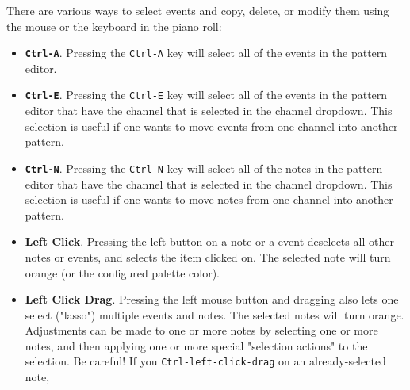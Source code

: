    \setcounter{ItemCounter}{0}      %

   There are various ways to select events and copy, delete, or modify them
   using the mouse or the keyboard in the piano roll:

   \begin{itemize}
      \item
         \textbf{\texttt{Ctrl-A}}.
         Pressing the \texttt{Ctrl-A} key will select all of the events in the
         pattern editor.
      \item
         \textbf{\texttt{Ctrl-E}}.
         Pressing the \texttt{Ctrl-E} key will select all of the events in the
         pattern editor that have the channel that is selected in the
         channel dropdown.
         This selection is useful if one wants to move events from one channel
         into another pattern.
      \item
         \textbf{\texttt{Ctrl-N}}.
         Pressing the \texttt{Ctrl-N} key will select all of the notes
         in the pattern editor that have the channel that is selected in the
         channel dropdown.
         This selection is useful if one wants to move notes from one channel
         into another pattern.
      \item
         \textbf{Left Click}.
         Pressing the left button on a note or a event deselects all other
         notes or events, and selects the item clicked on.
         The selected note will turn orange (or the configured palette color).
      \item
         \textbf{Left Click Drag}.
         Pressing the left mouse button and dragging also lets one
         select ("lasso") multiple events and notes.
         The selected notes will turn orange.
         Adjustments can be made to one or more notes by selecting one or more
         notes, and then applying one or more special
         "selection actions" to the selection.
         Be careful!  If you \texttt{Ctrl-left-click-drag}
         on an already-selected note,

\end{itemize}
